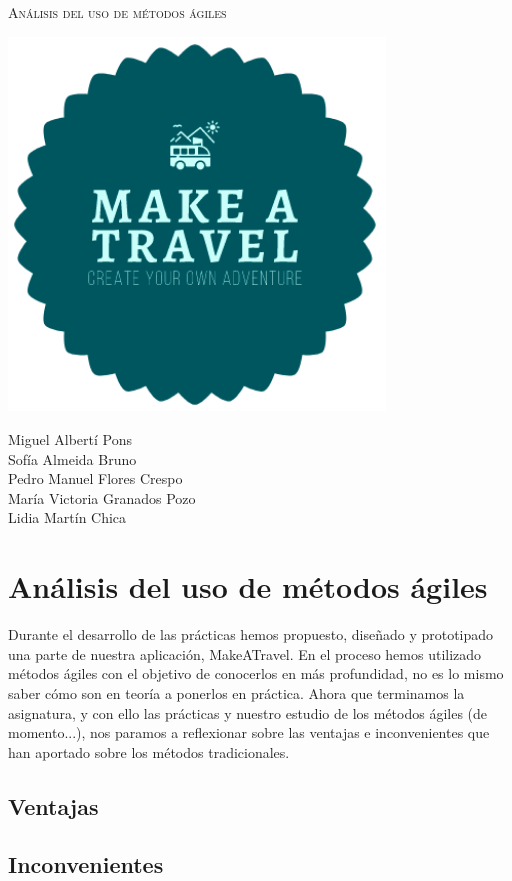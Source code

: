 \documentclass[11pt]{article}
\begin{document}
\begin{titlepage}
\centering
\vspace{4.5cm}
{\scshape\LARGE Análisis del uso de métodos ágiles\par}
\vspace{1.5cm}

\includegraphics[width=10cm] {Logo}

\vspace{3cm}
{\scshape\large \par}
\vspace{1cm}

{Miguel Albertí Pons\\
Sofía Almeida Bruno\\
Pedro Manuel Flores Crespo\\
María Victoria Granados Pozo\\
Lidia Martín Chica
\par}

\end{titlepage}

\newpage
\section{Análisis del uso de métodos ágiles}
Durante el desarrollo de las prácticas hemos propuesto, diseñado y prototipado una parte de nuestra aplicación, MakeATravel. En el proceso hemos utilizado métodos ágiles con el objetivo de conocerlos en más profundidad, no es lo mismo saber cómo son en teoría a ponerlos en práctica. Ahora que terminamos la asignatura, y con ello las prácticas y nuestro estudio de los métodos ágiles (de momento...), nos paramos a reflexionar sobre las ventajas e inconvenientes que han aportado sobre los métodos tradicionales.

\subsection*{Ventajas}


\subsection*{Inconvenientes}
\end{document}
